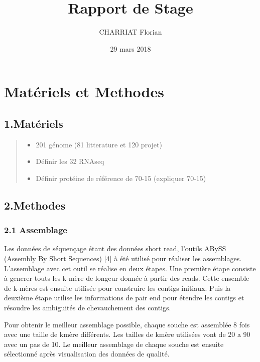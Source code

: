 \documentclass[]{article}
\title{Rapport de Stage}
\author{CHARRIAT Florian}
\date{29 mars 2018}
\providecommand{\tightlist}{%
  \setlength{\itemsep}{0pt}\setlength{\parskip}{0pt}}
\begin{document}
\maketitle

\section{Matériels et Methodes}\label{materiels-et-methodes}

\subsection{1.Matériels}\label{materiels}

\begin{quote}
\begin{itemize}
\tightlist
\item
  201 génome (81 litterature et 120 projet)
\item
  Définir les 32 RNAseq
\item
  Définir protéine de référence de 70-15 (expliquer 70-15)
\end{itemize}
\end{quote}

\subsection{2.Methodes}\label{methodes}

\subsubsection{2.1 Assemblage}\label{assemblage}

Les données de séquençage étant des données short read, l'outils ABySS
(Assembly By Short Sequences) {[}4{]} à été utilisé pour réaliser les
assemblages. L'assemblage avec cet outil se réalise en deux étapes. Une
première étape consiste à generer touts les k-mère de longeur donnée à
partir des reads. Cette ensemble de k-mères est ensuite utilisée pour
construire les contigs initiaux. Puis la deuxième étape utilise les
informations de pair end pour étendre les contigs et résoudre les
ambiguités de chevauchement des contigs.

Pour obtenir le meilleur assemblage possible, chaque souche est
assemblée 8 fois avec une taille de kmère différents. Les tailles de
kmère utilisées vont de 20 a 90 avec un pas de 10. Le meilleur
assemblage de chaque souche est ensuite sélectionné après visualisation
des données de qualité.
\end{document}
